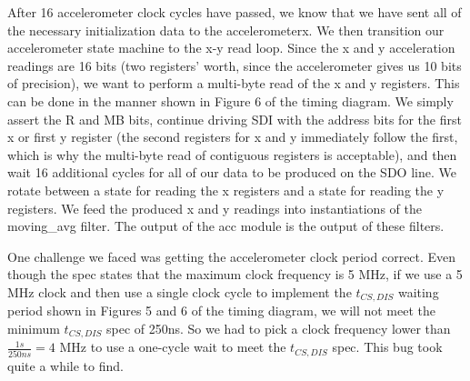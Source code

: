 \documentclass{article}
\begin{document}
After 16 accelerometer clock cycles have passed, we know that we have sent all of the necessary initialization data to the accelerometerx.
We then transition our accelerometer state machine to the x-y read loop.
Since the x and y acceleration readings are 16 bits (two registers' worth, since the accelerometer gives us 10 bits of precision),
we want to perform a multi-byte read of the x and y registers.
This can be done in the manner shown in Figure 6 of the timing diagram.
We simply assert the R and MB bits, continue driving SDI with the address bits for the first x or first y register (the second registers for x and y immediately follow the first, which is why the multi-byte read of contiguous registers is acceptable),
and then wait 16 additional cycles for all of our data to be produced on the SDO line.
We rotate between a state for reading the x registers and a state for reading the y registers.
We feed the produced x and y readings into instantiations of the moving\_avg filter.
The output of the acc module is the output of these filters.

One challenge we faced was getting the accelerometer clock period correct.
Even though the spec states that the maximum clock frequency is 5 MHz,
if we use a 5 MHz clock and then use a single clock cycle to implement the $t_{CS,DIS}$ waiting period shown in Figures 5 and 6 of the timing diagram,
we will not meet the minimum $t_{CS,DIS}$ spec of 250ns.
So we had to pick a clock frequency lower than $\frac{1s}{250ns} = 4$ MHz to use a one-cycle wait to meet the $t_{CS,DIS}$ spec.
This bug took quite a while to find.
\end{document}
